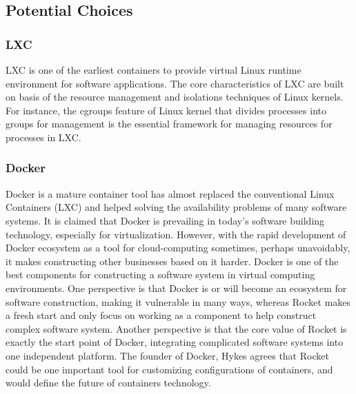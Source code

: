 \documentclass[letterpaper,10pt]{article}
\begin{document}
	\subsection{Potential Choices}
		\subsubsection{LXC}
    LXC is one of the earliest containers to provide virtual Linux runtime environment for software applications. The core characteristics of LXC are built on basis of the resource management and isolations techniques of Linux kernels. For instance, the cgroups feature of Linux kernel that divides processes into groups for management is the essential framework for managing resources for processes in LXC.

		\subsubsection{Docker}
    Docker is a mature container tool has almost replaced the conventional Linux Containers (LXC) and helped solving the availability problems of many software systems. It is claimed that Docker is prevailing in today’s software building technology, especially for virtualization. However, with the rapid development of Docker ecosystem as a tool for cloud-computing sometimes, perhaps unavoidably, it makes constructing other businesses based on it harder.
Docker is one of the best components for constructing a software system in virtual computing environments. One perspective is that Docker is or will become an ecosystem for software construction, making it vulnerable in many ways, whereas Rocket makes a fresh start and only focus on working as a component to help construct complex software system. Another perspective is that the core value of Rocket is exactly the start point of Docker, integrating complicated software systems into one independent platform. The founder of Docker, Hykes agrees that Rocket could be one important tool for customizing configurations of containers, and would define the future of containers technology.
\end{document}
